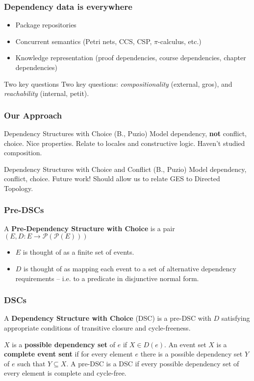 \documentclass{beamer}
\newcommand{\Pc}{\mathcal{P}}
\begin{document}
\begin{frame}
\frametitle{Dependency data is everywhere}
\begin{itemize}
\item Package repositories
\item Concurrent semantics (Petri nets, CCS, CSP, \(\pi\)-calculus, etc.)
\item Knowledge representation (proof dependencies, course dependencies, chapter dependencies)
\end{itemize}
\begin{block}{Two key questions}
Two key questions: \textit{compositionality} (external, gros), and \textit{reachability} (internal, petit).
\end{block}
\end{frame}


\begin{frame}
\frametitle{Our Approach}
\begin{block}{Dependency Structures with Choice (B., Puzio)}
Model dependency, \textbf{not} conflict, choice. Nice properties. Relate to locales and constructive logic. Haven't studied composition.
\end{block}
\begin{block}{Dependency Structures with Choice and Conflict (B., Puzio)}
Model dependency, conflict, choice. Future work! Should allow us to relate GES to Directed Topology.
\end{block}
\end{frame}

\begin{frame}
\frametitle{Pre-DSCs}
\begin{definition}
A \textbf{Pre-Dependency Structure with Choice} is a pair \((E, D : E \rightarrow \Pc(\Pc(E)))\) \end{definition}
\begin{itemize}
\item \(E\) is thought of as a finite set of events.
\item \(D\) is thought of as mapping each event to a set of alternative dependency requirements -- i.e. to a predicate in disjunctive normal form.
\end{itemize}
\end{frame}


\begin{frame}
\frametitle{DSCs}
\begin{definition}
A \textbf{Dependency Structure with Choice} (DSC) is a pre-DSC with \(D\) satisfying appropriate conditions of transitive closure and cycle-freeness.
\end{definition}
\(X\) is a \textbf{possible dependency set} of \(e\) if \(X \in D(e)\). An event set \(X\) is a \textbf{complete event sent} if for every element \(e\) there is a possible dependency set \(Y\) of \(e\) such that \(Y \subseteq X\). A pre-DSC is a DSC if every possible dependency set of every element is complete and cycle-free.
\end{frame}
\end{document}
